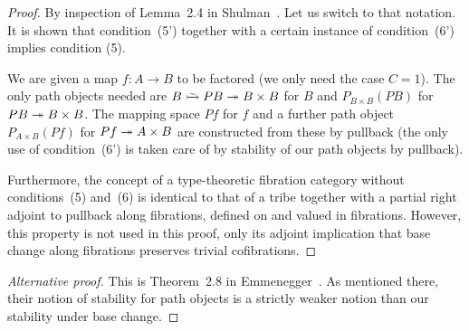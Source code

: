 \documentclass[reqno,10pt,a4paper,oneside]{amsart}
\begin{document}
\begin{proof}
By inspection of Lemma~2.4 in Shulman~\cite{shulman:inverse-diagrams}.
Let us switch to that notation.
It is shown that condition~(5') together with a certain instance of condition~(6') implies condition (5).

We are given a map $f : A \to B$ to be factored (we only need the case $C = 1$).
The only path objects needed are $B \acof P B \fib B \times B$ for $B$ and $P_{B \times B} (P B)$ for $P B \twoheadrightarrow B \times B$.
The mapping space $P f$ for $f$ and a further path object $P_{A \times B} (P f)$ for $P f \twoheadrightarrow A \times B$ are constructed from these by pullback (the only use of condition~(6') is taken care of by stability of our path objects by pullback).

Furthermore, the concept of a type-theoretic fibration category without conditions~(5) and~(6) is identical to that of a tribe together with a partial right adjoint to pullback along fibrations, defined on and valued in fibrations.
However, this property is not used in this proof, only its adjoint implication that base change along fibrations preserves trivial cofibrations.
\end{proof}

\begin{proof}[Alternative proof]
This is Theorem~2.8 in Emmenegger~\cite{emmenegger:stable-path-objects-wfs}.
As mentioned there, their notion of stability for path objects is a strictly weaker notion than our stability under base change.
\end{proof}
\end{document}
